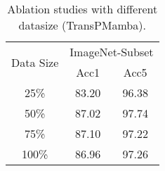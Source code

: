
\begin{table}[]
\centering
\scalebox{0.9}
{
\begin{tabular}{c|cc}
\midrule
\multirow{2}{*}{Data Size} & \multicolumn{2}{c}{ImageNet-Subset} \\
                       & \multicolumn{1}{c|}{Acc1}   & Acc5  \\ \midrule
 25\%         &    83.20                         & 96.38      \\
 50\%                &  87.02                           &   97.74    \\
75\%                 &  87.10                           &  97.22     \\
100\%     &  86.96                           &  97.26     \\
\midrule
\end{tabular}}
\caption{
Ablation studies with different datasize (TransPMamba).
}
\label{tab:aba_datasize}
\end{table}